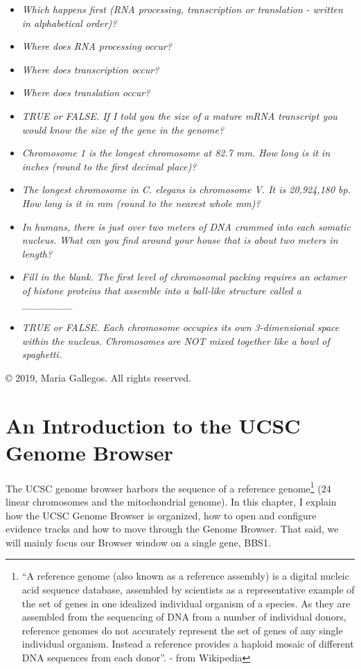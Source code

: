 \documentclass[
]{book}
\providecommand{\tightlist}{%
  \setlength{\itemsep}{0pt}\setlength{\parskip}{0pt}}
\begin{document}
\begin{itemize}
\tightlist
\item
  \emph{Which happens first (RNA processing, transcription or translation - written in alphabetical order)?}
\item
  \emph{Where does RNA processing occur?}
\item
  \emph{Where does transcription occur?}
\item
  \emph{Where does translation occur?}
\item
  \emph{TRUE or FALSE. If I told you the size of a mature mRNA transcript you would know the size of the gene in the genome?}
\item
  \emph{Chromosome 1 is the longest chromosome at 82.7 mm. How long is it in inches (round to the first decimal place)?}
\item
  \emph{The longest chromosome in C. elegans is chromosome V. It is 20,924,180 bp. How long is it in mm (round to the nearest whole mm)?}
\item
  \emph{In humans, there is just over two meters of DNA crammed into each somatic nucleus. What can you find around your house that is about two meters in length?}
\item
  \emph{Fill in the blank. The first level of chromosomal packing requires an octamer of histone proteins that assemble into a ball-like structure called a \_\_\_\_\_\_\_}
\item
  \emph{TRUE or FALSE. Each chromosome occupies its own 3-dimensional space within the nucleus. Chromosomes are NOT mixed together like a bowl of spaghetti.}
\end{itemize}

© 2019, Maria Gallegos. All rights reserved.

\hypertarget{an-introduction-to-the-ucsc-genome-browser}{%
\chapter{An Introduction to the UCSC Genome Browser}\label{an-introduction-to-the-ucsc-genome-browser}}

The UCSC genome browser harbors the sequence of a reference genome\footnote{``A reference genome (also known as a reference assembly) is a digital nucleic acid sequence database, assembled by scientists as a representative example of the set of genes in one idealized individual organism of a species. As they are assembled from the sequencing of DNA from a number of individual donors, reference genomes do not accurately represent the set of genes of any single individual organism. Instead a reference provides a haploid mosaic of different DNA sequences from each donor''. - from Wikipedia} (24 linear chromosomes and the mitochondrial genome). In this chapter, I explain how the UCSC Genome Browser is organized, how to open and configure evidence tracks and how to move through the Genome Browser. That said, we will mainly focus our Browser window on a single gene, BBS1.
\end{document}
